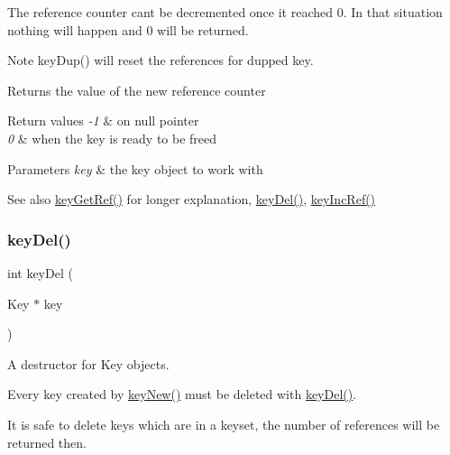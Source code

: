 The reference counter can\textquotesingle{}t be decremented once it reached 0. In that situation nothing will happen and 0 will be returned.

\begin{DoxyNote}{Note}
key\+Dup() will reset the references for dupped key.
\end{DoxyNote}
\begin{DoxyReturn}{Returns}
the value of the new reference counter 
\end{DoxyReturn}

\begin{DoxyRetVals}{Return values}
{\em -\/1} & on null pointer \\
\hline
{\em 0} & when the key is ready to be freed \\
\hline
\end{DoxyRetVals}

\begin{DoxyParams}{Parameters}
{\em key} & the key object to work with \\
\hline
\end{DoxyParams}
\begin{DoxySeeAlso}{See also}
\hyperlink{group__key_ga4aabc4272506dd63161db2bbb42de8ae}{key\+Get\+Ref()} for longer explanation, \hyperlink{group__key_ga3df95bbc2494e3e6703ece5639be5bb1}{key\+Del()}, \hyperlink{group__key_ga6970a6f254d67af7e39f8e469bb162f1}{key\+Inc\+Ref()} 
\end{DoxySeeAlso}
\mbox{\label{group__key_ga3df95bbc2494e3e6703ece5639be5bb1}} 
\subsubsection{\texorpdfstring{key\+Del()}{keyDel()}}
{\footnotesize\ttfamily int key\+Del (\begin{DoxyParamCaption}\item[{Key $\ast$}]{key }\end{DoxyParamCaption})}



A destructor for Key objects. 

Every key created by \hyperlink{group__key_gad23c65b44bf48d773759e1f9a4d43b89}{key\+New()} must be deleted with \hyperlink{group__key_ga3df95bbc2494e3e6703ece5639be5bb1}{key\+Del()}.

It is safe to delete keys which are in a keyset, the number of references will be returned then.

